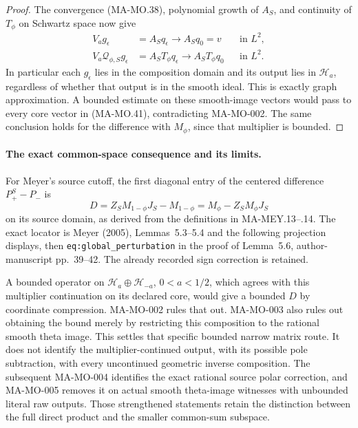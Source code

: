 \begin{proof}
The convergence (MA-MO.38), polynomial growth of \(A_S\),
and continuity of \(T_\phi\) on Schwartz space now give
\[
 \begin{aligned}
 V_ag_\epsilon&=A_Sq_\epsilon\longrightarrow A_Sq_0=v
                                                   &&\text{in }L^2,\\
 V_a\mathcal Q_{\phi,S}g_\epsilon
       &=A_ST_\phi q_\epsilon
                        \longrightarrow A_ST_\phi q_0
                                                   &&\text{in }L^2.
 \end{aligned}
 \tag{MA-MO.41}
\]
In particular each \(g_\epsilon\) lies in the composition
domain and its output lies in \(\mathcal H_a\), regardless
of whether that output is in the smooth ideal.
This is exactly graph approximation.
A bounded estimate on these smooth-image vectors would
pass to every core vector in (MA-MO.41), contradicting
MA-MO-002. The same conclusion holds for the difference
with \(M_\phi\), since that multiplier is bounded.
\end{proof}

\paragraph{The exact common-space consequence and its limits.}
For Meyer's source cutoff, the first diagonal entry of
the centered difference \(P_+^S-P_-\) is
\[
 D=Z_SM_{1-\phi}J_S-M_{1-\phi}
                   =M_\phi-Z_SM_\phi J_S
 \tag{MA-MO.42}
\]
on its source domain, as derived from the definitions
in MA-MEY.13--.14. The exact locator is Meyer (2005),
Lemmas~5.3--5.4 and the following projection displays,
then \texttt{eq:global\_perturbation} in the proof of
Lemma~5.6, author-manuscript pp.~39--42.
The already recorded sign correction is retained.

A bounded operator on
\(\mathcal H_a\oplus\mathcal H_{-a}\), \(0<a<1/2\),
which agrees with this multiplier continuation on its
declared core, would give a bounded \(D\) by coordinate
compression. MA-MO-002 rules that out. MA-MO-003 also
rules out obtaining the bound merely by restricting
this composition to the rational smooth theta image.
This settles that specific bounded narrow matrix route.
It does not identify the multiplier-continued output,
with its possible pole subtraction, with every
uncontinued geometric inverse composition.
The subsequent MA-MO-004 identifies the exact rational source
polar correction, and MA-MO-005 removes it on actual smooth
theta-image witnesses with unbounded literal raw outputs.
Those strengthened statements retain the distinction between
the full direct product and the smaller common-sum subspace.

